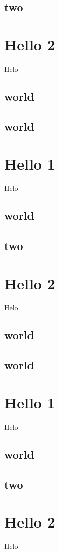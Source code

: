 \documentclass[10pt]{book}
\begin{document}
\section{two}

\chapter{Hello 2}
Helo
\section{world }
\section{world }\chapter{Hello 1}
Helo
\section{world }
\section{two}

\chapter{Hello 2}
Helo
\section{world }
\section{world }\chapter{Hello 1}
Helo
\section{world }
\section{two}

\chapter{Hello 2}
Helo
\end{document}
